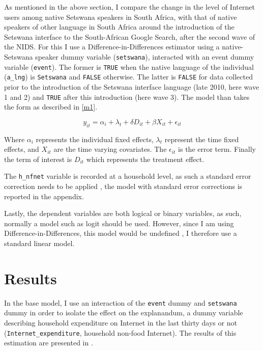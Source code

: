 \documentclass[a4paper,british]{article}\usepackage[]{graphicx}\usepackage[]{color}
\providecommand*{\code}[1]{\texttt{#1}}
\begin{document}
\label{subsec:estimation}As mentioned in the above section, I compare
the change in the level of Internet users among native Setswana speakers
in South Africa, with that of native speakers of other language in
South Africa around the introduction of the Setswana interface to
the South-African Google Search, after the second wave of the NIDS.
For this I use a Difference-in-Differences estimator \citep{abadie2005semiparametric,imbens2009econometrics}
using a native-Setswana speaker dummy variable (\code{setswana}),
interacted with an event dummy variable (\code{event}). The former
is \code{TRUE} when the native language of the individual (\code{a\_lng})
is \code{Setswana} and \code{FALSE} otherwise. The latter is \code{FALSE}
for data collected prior to the introduction of the Setswana interface
language (late 2010, here wave 1 and 2) and \code{TRUE} after this
introduction (here wave 3). The model than takes the form as described
in \eqref{m1}.

\begin{equation}
y_{it}=\alpha_{i}+\lambda_{t}+\delta D{}_{it}+\beta X_{it}+\epsilon_{it}\label{eq:m1}
\end{equation}

Where $\alpha_{i}$ represents the individual fixed effects, $\lambda_{t}$
represent the time fixed effects, and $X_{it}$ are the time varying
covariates. The $\epsilon_{it}$ is the error term. Finally the term
of interest is $D_{it}$ which represents the treatment effect.

The \code{h\_nfnet} variable is recorded at a household level, as
such a standard error correction needs to be applied \citep{white1980heteroskedasticity},
the model with standard error corrections is reported in the appendix.

Lastly, the dependent variables are both logical or binary variables,
as such, normally a model such as logit should be used. However, since
I am using Difference-in-Differences, this model would be undefined
\citep{wooldridge2010econometric}, I therefore use a standard linear
model. 

\section{Results}

\label{sec:results}In the base model, I use an interaction of the
\code{event} dummy and \code{setswana} dummy in order to isolate
the effect on the explanandum, a dummy variable describing household
expenditure on Internet in the last thirty days or not (\code{Internet\_expenditure},
household non-food Internet). The results of this estimation are presented
in .
\end{document}

